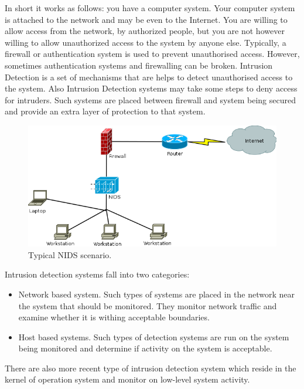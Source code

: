 \documentclass[thesis=M,english]{FITthesis}[2011/07/15]
\begin{document}
In short it works as follows: you have a computer system. Your computer system is attached to the network and may be even to the Internet. You are willing to allow access from the network, by authorized people, but you are not however willing to allow unauthorized access to the system by anyone else. Typically, a firewall or authentication system is used to prevent unauthorised access. However, sometimes authentication systems and firewalling can be broken. Intrusion Detection is a set of mechanisms that are helps to detect unauthorised access to the system. Also Intrusion Detection systems may take some steps to deny access for intruders. Such systems are placed between firewall and system being secured and provide an extra layer of protection to that system.
\begin{figure}
\centering
\includegraphics[scale=0.5]{images/Typical_NIDS.png}
\caption{Typical NIDS scenario.}
\end{figure}
Intrusion detection systems fall into two categories:
\begin{itemize}
\item Network based system. 
Such types of systems are placed in the network near the system that should be monitored. They monitor network traffic and examine whether it is withing acceptable boundaries.
\item Host based systems. 
Such types of detection systems are run on the system being monitored and determine if activity on the system is acceptable.
\end{itemize}
There are also more recent type of intrusion detection system which reside in the kernel of operation system and monitor on low-level system activity.
\end{document}
